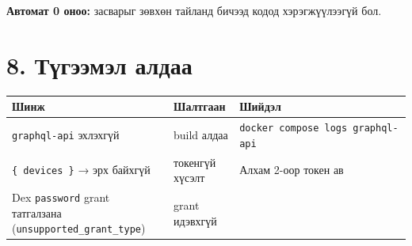 \textbf{Автомат 0 оноо:} засварыг зөвхөн тайланд бичээд кодод хэрэгжүүлээгүй бол.

\hypertarget{ux442ux4afux433ux44dux44dux43cux44dux43b-ux430ux43bux434ux430ux430}{%
\section{8. Түгээмэл алдаа}\label{ux442ux4afux433ux44dux44dux43cux44dux43b-ux430ux43bux434ux430ux430}}

\begingroup\scriptsize\begin{longtable}[]{@{}lll@{}}
\toprule
\begin{minipage}[b]{0.30\columnwidth}\raggedright
Шинж\strut
\end{minipage} & \begin{minipage}[b]{0.30\columnwidth}\raggedright
Шалтгаан\strut
\end{minipage} & \begin{minipage}[b]{0.30\columnwidth}\raggedright
Шийдэл\strut
\end{minipage}\tabularnewline
\midrule
\endhead
\begin{minipage}[t]{0.30\columnwidth}\raggedright
\texttt{graphql-api} эхлэхгүй\strut
\end{minipage} & \begin{minipage}[t]{0.30\columnwidth}\raggedright
build алдаа\strut
\end{minipage} & \begin{minipage}[t]{0.30\columnwidth}\raggedright
\texttt{docker\ compose\ logs\ graphql-api}\strut
\end{minipage}\tabularnewline
\begin{minipage}[t]{0.30\columnwidth}\raggedright
\texttt{\{\ devices\ \}} → эрх байхгүй\strut
\end{minipage} & \begin{minipage}[t]{0.30\columnwidth}\raggedright
токенгүй хүсэлт\strut
\end{minipage} & \begin{minipage}[t]{0.30\columnwidth}\raggedright
Алхам 2-оор токен ав\strut
\end{minipage}\tabularnewline
\begin{minipage}[t]{0.30\columnwidth}\raggedright
Dex \texttt{password} grant татгалзана (\texttt{unsupported\_\allowbreak{}grant\_\allowbreak{}type})\strut
\end{minipage} & \begin{minipage}[t]{0.30\columnwidth}\raggedright
grant идэвхгүй\strut
\end{minipage} & \begin{minipage}[t]{0.30\columnwidth}\raggedright

\end{minipage}
\end{longtable}
